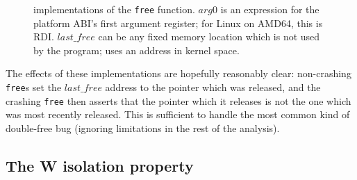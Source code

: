 \begin{figure}

  \caption{{\StateMachine} implementations of the \texttt{free}
    function. $arg0$ is an expression for the platform ABI's first
    argument register; for Linux on AMD64, this is RDI.
    $\mathit{last\_free}$ can be any fixed memory location which is
    not used by the program; {\implementation} uses an address in
    kernel space.}
  \label{fig:library_free}
\end{figure}

The effects of these implementations are hopefully reasonably clear:
non-crashing \texttt{free}s set the $\mathit{last\_free}$ address to
the pointer which was released, and the crashing \texttt{free} then
asserts that the pointer which it releases is not the one which was
most recently released.  This is sufficient to handle the most common
kind of double-free bug (ignoring limitations in the rest of the
analysis).  

\subsection{The W isolation property}


